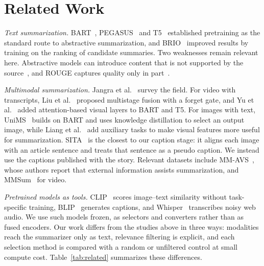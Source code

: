 \documentclass[conference]{IEEEtran}
\begin{document}
\section{Related Work}
\textit{Text summarization.} BART~\cite{lewis2020bart}, PEGASUS~\cite{zhang2020pegasus} and T5~\cite{raffel2020t5} established pretraining as the standard route to abstractive summarization, and BRIO~\cite{liu2022brio} improved results by training on the ranking of candidate summaries. Two weaknesses remain relevant here. Abstractive models can introduce content that is not supported by the source~\cite{maynez2020faithfulness,kryscinski2020factcc}, and ROUGE captures quality only in part~\cite{fabbri2021summeval}.

\textit{Multimodal summarization.} Jangra et al.~\cite{jangra2023survey} survey the field. For video with transcripts, Liu et al.~\cite{liu2020multistage} proposed multistage fusion with a forget gate, and Yu et al.~\cite{yu2021vgbart} added attention-based visual layers to BART and T5. For images with text, UniMS~\cite{zhang2022unims} builds on BART and uses knowledge distillation to select an output image, while Liang et al.~\cite{liang2023sov} add auxiliary tasks to make visual features more useful for summarization. SITA~\cite{jiang2023sita} is the closest to our caption stage: it aligns each image with an article sentence and treats that sentence as a pseudo caption. We instead use the captions published with the story. Relevant datasets include MM-AVS~\cite{fu2021mmavs}, whose authors report that external information assists summarization, and MMSum~\cite{qiu2024mmsum} for video.

\textit{Pretrained models as tools.} CLIP~\cite{radford2021clip} scores image--text similarity without task-specific training, BLIP~\cite{li2022blip} generates captions, and Whisper~\cite{radford2023whisper} transcribes noisy web audio. We use such models frozen, as selectors and converters rather than as fused encoders. Our work differs from the studies above in three ways: modalities reach the summarizer only as text, relevance filtering is explicit, and each selection method is compared with a random or unfiltered control at small compute cost. Table~\ref{tab:related} summarizes these differences.
\end{document}
